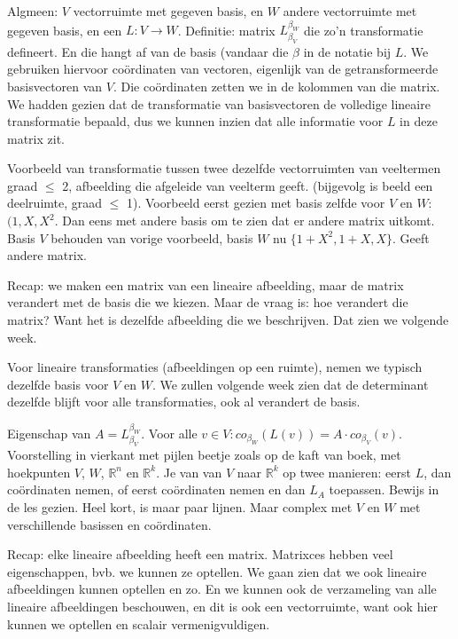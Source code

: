 \documentclass{article}
\begin{document}
Algmeen: $V$ vectorruimte met gegeven basis, en $W$ andere vectorruimte met gegeven basis, en een $L: V \to W$. Definitie: matrix $L_{\beta_V}^{\beta_W}$ die zo'n transformatie defineert. En die hangt af van de basis (vandaar die $\beta$ in de notatie bij $L$.  
We gebruiken hiervoor co\"ordinaten van vectoren, eigenlijk van de getransformeerde basisvectoren van $V$. Die co\"ordinaten zetten we in de kolommen van die matrix. We hadden gezien dat de transformatie van basisvectoren de volledige lineaire transformatie bepaald, dus we kunnen inzien dat alle informatie voor $L$ in deze matrix zit. 

Voorbeeld van transformatie tussen twee dezelfde vectorruimten van veeltermen graad $\leq$ 2, afbeelding die afgeleide van veelterm geeft. (bijgevolg is beeld een deelruimte, graad $\leq$ 1). Voorbeeld eerst gezien met basis zelfde voor $V$ en $W$:  $(1,X,X^2$. Dan eens met andere basis om te zien dat er andere matrix uitkomt. Basis $V$ behouden van vorige voorbeeld, basis $W$ nu $\{ 1+X^2, 1+X, X \}$. Geeft andere matrix. 

Recap: we maken een matrix van een lineaire afbeelding, maar de matrix verandert met de basis die we kiezen. Maar de vraag is: hoe verandert die matrix? Want het is dezelfde afbeelding die we beschrijven. Dat zien we volgende week. 

Voor lineaire transformaties (afbeeldingen op een ruimte), nemen we typisch dezelfde basis voor $V$ en $W$. We zullen volgende week zien dat de determinant dezelfde blijft voor alle transformaties, ook al verandert de basis. 

Eigenschap van $A = L_{\beta_V}^{\beta_W}$. Voor alle $v \in V: co_{\beta_W}(L(v)) = A \cdot co_{\beta_V}(v)$. Voorstelling in vierkant met pijlen beetje zoals op de kaft van boek, met hoekpunten $V$, $W$, $\mathbb{R}^n$ en $\mathbb{R}^k$. Je van van $V$ naar $\mathbb{R}^k$ op twee manieren: eerst $L$, dan co\"ordinaten nemen, of eerst co\"ordinaten nemen en dan $L_A$ toepassen. 
Bewijs in de les gezien. Heel kort, is maar paar lijnen. Maar complex met $V$ en $W$ met verschillende basissen en co\"ordinaten. 

Recap: 
elke lineaire afbeelding heeft een matrix. Matrixces hebben veel eigenschappen, bvb. we kunnen ze optellen. We gaan zien dat we ook lineaire afbeeldingen kunnen optellen en zo. En we kunnen ook de verzameling van alle lineaire afbeeldingen beschouwen, en dit is ook een vectorruimte, want ook hier kunnen we optellen en scalair vermenigvuldigen. 
\end{document}
